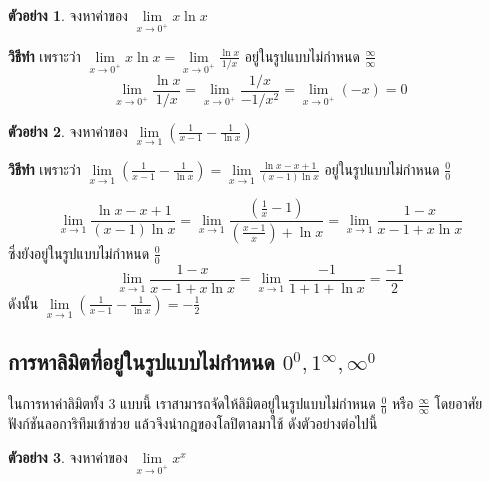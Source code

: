 \documentclass[
]{book}
\theoremstyle{definition}
\theoremstyle{definition}
\newtheorem{example}{ตัวอย่าง}[chapter]
\theoremstyle{definition}
\theoremstyle{definition}
\theoremstyle{remark}
\begin{document}
\begin{example}
จงหาค่าของ \(\mathop {\lim }\limits_{x\to 0^+} x\ln x\)
\end{example}

\textbf{วิธีทำ} เพราะว่า
\(\displaystyle \mathop {\lim }\limits_{x\to 0^+} x\ln x=\mathop
{\lim
}\limits_{x\to 0^+} \frac{\ln x}{1/x}\) อยู่ในรูปแบบไม่กำหนด \(\displaystyle
\frac{\infty
}{\infty }\)
\[\displaystyle \mathop {\lim }\limits_{x\to 0^+} \frac{\ln x}{1/x}=\mathop 
{\lim 
}\limits_{x\to 0^+} \frac{1/x}{-1/x^2}=\mathop {\lim }\limits_{x\to 0^+} 
(-x)=0\]

\begin{example}
จงหาค่าของ \(\displaystyle \mathop {\lim }\limits_{x\to 1}
(\frac{1}{x-1}-\frac{1}{\ln x})\)
\end{example}

\textbf{วิธีทำ} เพราะว่า \(\displaystyle \mathop {\lim }\limits_{x\to 1}
(\frac{1}{x-1}-\frac{1}{\ln
x})=\mathop {\lim }\limits_{x\to 1} \frac{\ln x-x+1}{(x-1)\ln x}\)
อยู่ในรูปแบบไม่กำหนด \(\displaystyle \frac{0}{0}\)

\[\displaystyle \mathop {\lim }\limits_{x\to 1} \frac{\ln x-x+1}{(x-1)\ln 
x}=\mathop {\lim 
}\limits_{x\to 1} \frac{(\frac{1}{x}-1)}{(\frac{x-1}{x})+\ln x}=\mathop 
{\lim }\limits_{x\to 1} \frac{1-x}{x-1+x\ln x}\] ซึ่งยังอยู่ในรูปแบบไม่กำหนด
\(\displaystyle \frac{0}{0}\)
\[\displaystyle \mathop {\lim }\limits_{x\to 1} \frac{1-x}{x-1+x\ln 
x}=\mathop {\lim 
}\limits_{x\to 1} \frac{-1}{1+1+\ln x}=\frac{-1}{2}\] ดังนั้น
\(\displaystyle \mathop {\lim }\limits_{x\to 1}
(\frac{1}{x-1}-\frac{1}{\ln
x})=-\frac{1}{2}\)

\subsection{\texorpdfstring{การหาลิมิตที่อยู่ในรูปแบบไม่กำหนด \(0^{0}, 1^{\infty}, \infty^0\)}{การหาลิมิตที่อยู่ในรูปแบบไม่กำหนด 0\^{}\{0\}, 1\^{}\{\textbackslash infty\}, \textbackslash infty\^{}0}}\label{uxe01uxe32uxe23uxe2buxe32uxe25uxe21uxe15uxe17uxe2duxe22uxe43uxe19uxe23uxe1buxe41uxe1auxe1auxe44uxe21uxe01uxe33uxe2buxe19uxe14-00-1infty-infty0}

ในการหาค่าลิมิตทั้ง 3 แบบนี้ เราสามารถจัดให้ลิมิตอยู่ในรูปแบบไม่กำหนด
\(\displaystyle \frac{0}{0}\) หรือ \(\displaystyle \frac{\infty }{\infty }\)
โดยอาศัยฟังก์ชันลอการิทึมเข้าช่วย แล้วจึงนำกฎของโลปิตาลมาใช้ ดังตัวอย่างต่อไปนี้

\begin{example}
จงหาค่าของ \(\mathop {\lim }\limits_{x\to 0^+} x^x\)
\end{example}
\end{document}
